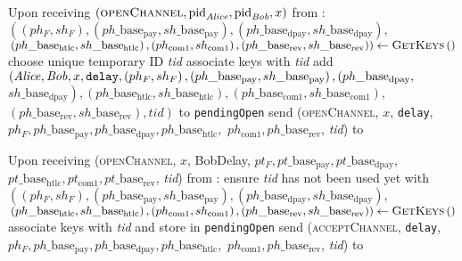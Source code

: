 \begin{algorithmic}[1]
    \State Upon receiving $\left(\textsc{openChannel}, \mathrm{pid}_{\mathit{Alice}},
    \mathrm{pid}_{\mathit{Bob}}, x\right)$ from \environment:
    \Indent
      \State $\left(\left(ph_F, sh_F\right),
      \left(ph\_\mathrm{base}_{\mathrm{pay}},
      sh\_\mathrm{base}_{\mathrm{pay}}\right),
      \left(ph\_\mathrm{base}_{\mathrm{dpay}},
      sh\_\mathrm{base}_{\mathrm{dpay}}\right),\right.$
      $\left.\left(ph\_\mathrm{base}_{\mathrm{htlc}},
      sh\_\mathrm{base}_{\mathrm{htlc}}\right), \left(ph_{\mathrm{com}1},
      sh_{\mathrm{com}1}\right), \left(ph\_\mathrm{base}_{\mathrm{rev}},
      sh\_\mathrm{base}_{\mathrm{rev}}\right)\right) \gets
      \textsc{GetKeys}\left(\right)$ 
      \State choose unique temporary ID \textit{tid} 
      \State associate keys with \textit{tid}
      \State add $\left(\mathit{Alice}, \mathit{Bob}, x, \mathtt{delay}, \left(ph_F,
      sh_F\right), \left(ph\_\mathrm{base}_{\mathrm{pay}},
      sh\_\mathrm{base}_{\mathrm{pay}}\right),
      \left(ph\_\mathrm{base}_{\mathrm{dpay}},\right.\right.$
      $\left.\left.sh\_\mathrm{base}_{\mathrm{dpay}}\right),
      \left(ph\_\mathrm{base}_{\mathrm{htlc}},
      sh\_\mathrm{base}_{\mathrm{htlc}}\right),
      \left(ph\_\mathrm{base}_{\mathrm{com}1},
      sh\_\mathrm{base}_{\mathrm{com}1}\right),\right.$
      $\left.\left(ph\_\mathrm{base}_{\mathrm{rev}},
      sh\_\mathrm{base}_{\mathrm{rev}}\right), \mathit{tid}\right)$ to
      \texttt{pendingOpen}
      \State send (\textsc{openChannel}, $x$, \texttt{delay}, $ph_F,
      ph\_\mathrm{base}_{\mathrm{pay}}, ph\_\mathrm{base}_{\mathrm{dpay}},
      ph\_\mathrm{base}_{\mathrm{htlc}},$ $ph_{\mathrm{com}1},
      ph\_\mathrm{base}_{\mathrm{rev}}$, \textit{tid}) to \bob
    \EndIndent
    \State

    \State Upon receiving (\textsc{openChannel}, $x$, BobDelay, $pt_F,
    pt\_\mathrm{base}_{\mathrm{pay}}, pt\_\mathrm{base}_{\mathrm{dpay}},$
    $pt\_\mathrm{base}_{\mathrm{htlc}}, pt_{\mathrm{com}1},
    pt\_\mathrm{base}_{\mathrm{rev}}$, \textit{tid}) from \bob:
    \Indent
      \State ensure \textit{tid} has not been used yet with \bob
      \State $\left(\left(ph_F, sh_F\right),
      \left(ph\_\mathrm{base}_{\mathrm{pay}},
      sh\_\mathrm{base}_{\mathrm{pay}}\right),
      \left(ph\_\mathrm{base}_{\mathrm{dpay}},
      sh\_\mathrm{base}_{\mathrm{dpay}}\right),\right.$
      $\left.\left(ph\_\mathrm{base}_{\mathrm{htlc}},
      sh\_\mathrm{base}_{\mathrm{htlc}}\right),
      \left(ph_{\mathrm{com}1}, sh_{\mathrm{com}1}\right),
      \left(ph\_\mathrm{base}_{\mathrm{rev}},
      sh\_\mathrm{base}_{\mathrm{rev}}\right)\right) \gets
      \textsc{GetKeys}\left(\right)$ 
      \State associate keys with \textit{tid} and store in \texttt{pendingOpen}
      \State send (\textsc{acceptChannel}, \texttt{delay}, $ph_F,
      ph\_\mathrm{base}_{\mathrm{pay}}, ph\_\mathrm{base}_{\mathrm{dpay}},
      ph\_\mathrm{base}_{\mathrm{htlc}},$ $ph_{\mathrm{com}1},
      ph\_\mathrm{base}_{\mathrm{rev}}$, \textit{tid}) to \bob
    \EndIndent
    \State


\end{algorithmic}
